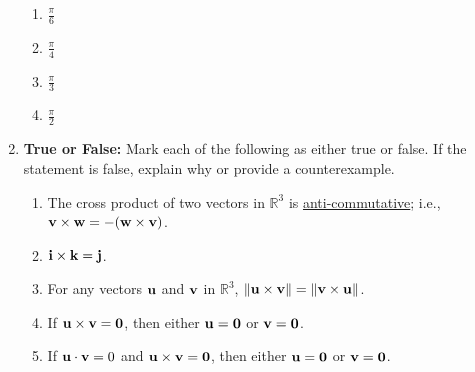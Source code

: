 \documentclass[12pt]{article}
\newif\ifans
\begin{document}
\begin{enumerate}
\begin{enumerate}
\item $\frac{\pi}{6}$

\item $\frac{\pi}{4}$

\item $\frac{\pi}{3}$

\item $\frac{\pi}{2}$

\end{enumerate}

\ifans{\fbox{c}} \fi

\item {\bf True or False:}  Mark each of the following as either true or false. If the statement is false, explain why or provide a counterexample.

\begin{enumerate}

\item The cross product of two vectors in $\mathbb{R}^3$ is \underline{anti-commutative}; i.e., ${\bf v}\times{\bf w}=-({\bf w}\times{\bf v})$.

\ifans{\fbox{True}} \fi

\item ${\bf i}\times{\bf k}={\bf j}$.

\ifans{\fbox{False; ${\bf i}\times{\bf k}=-{\bf j}$}} \fi

\item For any vectors ${\bf u}$ and ${\bf v}$ in $\mathbb{R}^3$, $\|{\bf u}\times{\bf v}\|=\|{\bf v}\times{\bf u}\|$.

\ifans{\fbox{True}} \fi

\item If ${\bf u}\times{\bf v}={\bf 0}$, then either ${\bf u}={\bf 0}$ or ${\bf v}={\bf 0}$.

\ifans{\fbox{False; If ${\bf u}$ is parallel to ${\bf v}$, then ${\bf u}\times{\bf v}={\bf 0}$.}} \fi

\item If ${\bf u}\cdot {\bf v}=0$ and ${\bf u}\times{\bf v}={\bf 0}$, then either ${\bf u}={\bf 0}$ or ${\bf v}={\bf 0}$.

\ifans{\fbox{True}} \fi

\end{enumerate}

\end{enumerate}
\end{document}
